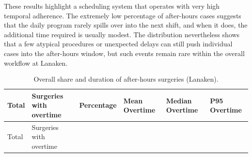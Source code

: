 \documentclass[
]{article}
\begin{document}
These results highlight a scheduling system that operates with very high
temporal adherence. The extremely low percentage of after-hours cases
suggests that the daily program rarely spills over into the next shift,
and when it does, the additional time required is usually modest. The
distribution nevertheless shows that a few atypical procedures or
unexpected delays can still push individual cases into the after-hours
window, but such events remain rare within the overall workflow at
Lanaken.

\begin{longtable}[]{@{}
  >{\centering\arraybackslash}p{}
  >{\centering\arraybackslash}p{}
  >{\centering\arraybackslash}p{}
  >{\centering\arraybackslash}p{}
  >{\centering\arraybackslash}p{}
  >{\centering\arraybackslash}p{}@{}}
\caption{Overall share and duration of after-hours surgeries (Lanaken).
\label{tab:overtime_summary}}\tabularnewline
\toprule\noalign{}
\begin{minipage}[b]{\linewidth}\centering
Total
\end{minipage} & \begin{minipage}[b]{\linewidth}\centering
Surgeries with overtime
\end{minipage} & \begin{minipage}[b]{\linewidth}\centering
Percentage
\end{minipage} & \begin{minipage}[b]{\linewidth}\centering
Mean Overtime
\end{minipage} & \begin{minipage}[b]{\linewidth}\centering
Median Overtime
\end{minipage} & \begin{minipage}[b]{\linewidth}\centering
P95 Overtime
\end{minipage} \\
\midrule\noalign{}
\endfirsthead
\toprule\noalign{}
\begin{minipage}[b]{\linewidth}\centering
Total
\end{minipage} & \begin{minipage}[b]{\linewidth}\centering
Surgeries with overtime
\end{minipage} & \begin{minipage}[b]{\linewidth}\centering

\end{minipage}
\end{longtable}
\end{document}
